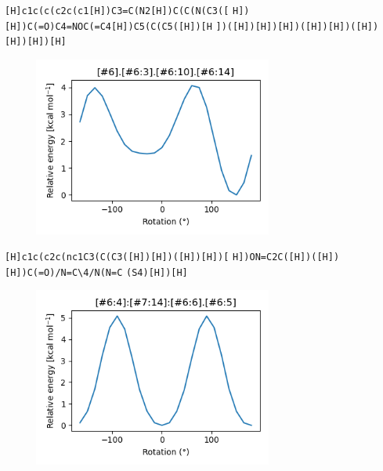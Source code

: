 \documentclass{beamer}
\begin{document}
\begin{frame}[fragile]
\verb|[H]c1c(c(c2c(c1[H])C3=C(N2[H])C(C(N(C3([|
\verb|H])[H])C(=O)C4=NOC(=C4[H])C5(C(C5([H])[H|
\verb|])([H])[H])[H])([H])[H])([H])[H])[H])[H]|

\begin{figure}
    \includegraphics[width=0.7\textwidth,height=0.7\textheight,keepaspectratio]{plot11.png}
\end{figure}
\end{frame}
\begin{frame}[fragile]
\verb|[H]c1c(c2c(nc1C3(C(C3([H])[H])([H])[H])[|
\verb|H])ON=C2C([H])([H])[H])C(=O)/N=C\4/N(N=C|
\verb|(S4)[H])[H]|

\begin{figure}
    \includegraphics[width=0.7\textwidth,height=0.7\textheight,keepaspectratio]{plot12.png}
\end{figure}
\end{frame}
\end{document}

